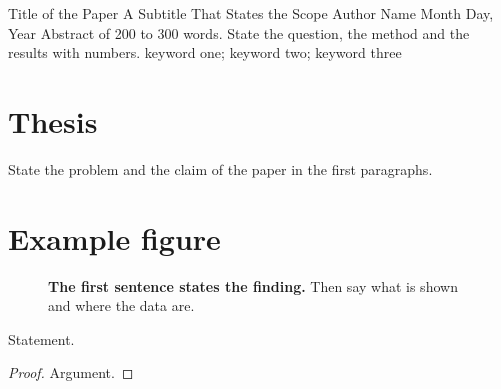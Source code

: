 \documentclass[10pt,twocolumn,letterpaper]{article}
\newcommand{\datadir}{../data/processed}
\begin{document}
\ewfmaketitle
  {Title of the Paper}
  {A Subtitle That States the Scope}
  {Author Name\footnotemark}
  {}%
  {Month Day, Year}
  {Abstract of 200 to 300 words. State the question, the method and the results with numbers.}
  {keyword one; keyword two; keyword three}

\section{Thesis}
State the problem and the claim of the paper in the first paragraphs.

\section{Example figure}
\begin{figure}[t]
\centering
{}
\caption{\textbf{The first sentence states the finding.} Then say what is shown and where the data are.}
\label{fig:example}
\end{figure}

\begin{proposition}[Name]
\label{prop:example}
Statement.
\end{proposition}
\begin{proof}
Argument.
\end{proof}

{\small

% 
}
\end{document}
